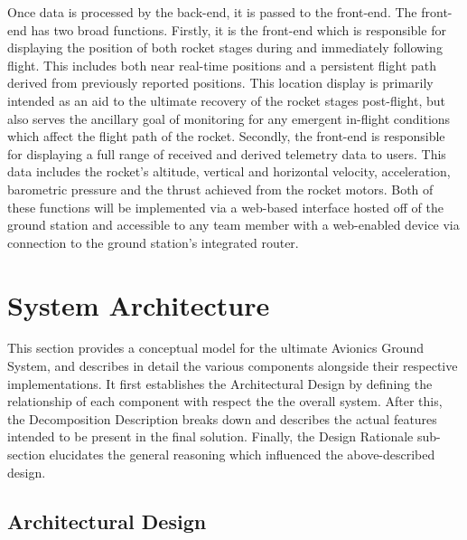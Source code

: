 \documentclass[journal,10pt,onecolumn,compsoc]{IEEEtran}
\begin{document}
	\noindent Once data is processed by the back-end, it is passed to the front-end.
	The front-end has two broad functions.
	Firstly, it is the front-end which is responsible for displaying the position of both rocket stages during and immediately following flight.
	This includes both near real-time positions and a persistent flight path derived from previously reported positions.
	This location display is primarily intended as an aid to the ultimate recovery of the rocket stages post-flight, but also serves the ancillary goal of monitoring for any emergent in-flight conditions which affect the flight path of the rocket.
	Secondly, the front-end is responsible for displaying a full range of received and derived telemetry data to users.
	This data includes the rocket’s altitude, vertical and horizontal velocity, acceleration, barometric pressure and the thrust achieved from the rocket motors.
	Both of these functions will be implemented via a web-based interface hosted off of the ground station and accessible to any team member with a web-enabled device via connection to the ground station's integrated router. 

	

\section{System Architecture}
	\noindent This section provides a conceptual model for the ultimate Avionics Ground System, and describes in detail the various components alongside their respective implementations.
	It first establishes the Architectural Design by defining the relationship of each component with respect the the overall system.
	After this, the Decomposition Description breaks down and describes the actual features intended to be present in the final solution.
	Finally, the Design Rationale sub-section elucidates the general reasoning which influenced the above-described design.

	\subsection{Architectural Design}

\end{document}
